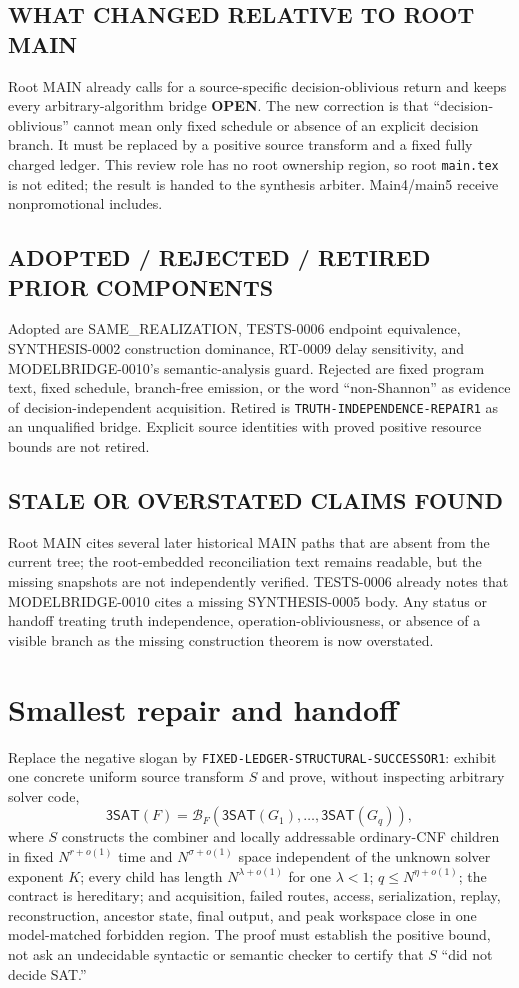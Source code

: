 \documentclass[11pt]{article}
\newcommand{\SAT}{\mathsf{3SAT}}
\newcommand{\OPEN}{\textbf{OPEN}}
\begin{document}
\subsection*{WHAT CHANGED RELATIVE TO ROOT MAIN}
Root MAIN already calls for a source-specific decision-oblivious return and
keeps every arbitrary-algorithm bridge \OPEN.  The new correction is that
``decision-oblivious'' cannot mean only fixed schedule or absence of an
explicit decision branch.  It must be replaced by a positive source transform
and a fixed fully charged ledger.  This review role has no root ownership
region, so root \texttt{main.tex} is not edited; the result is handed to the
synthesis arbiter.  Main4/main5 receive nonpromotional includes.

\subsection*{ADOPTED / REJECTED / RETIRED PRIOR COMPONENTS}
Adopted are SAME\_REALIZATION, TESTS-0006 endpoint equivalence,
SYNTHESIS-0002 construction dominance, RT-0009 delay sensitivity, and
MODELBRIDGE-0010's semantic-analysis guard.  Rejected are fixed program text,
fixed schedule, branch-free emission, or the word ``non-Shannon'' as evidence
of decision-independent acquisition.  Retired is
\texttt{TRUTH-INDEPENDENCE-REPAIR1} as an unqualified bridge.  Explicit
source identities with proved positive resource bounds are not retired.

\subsection*{STALE OR OVERSTATED CLAIMS FOUND}
Root MAIN cites several later historical MAIN paths that are absent from the
current tree; the root-embedded reconciliation text remains readable, but the
missing snapshots are not independently verified.  TESTS-0006 already notes
that MODELBRIDGE-0010 cites a missing SYNTHESIS-0005 body.  Any status or
handoff treating truth independence, operation-obliviousness, or absence of a
visible branch as the missing construction theorem is now overstated.

\section{Smallest repair and handoff}

Replace the negative slogan by
\texttt{FIXED-LEDGER-STRUCTURAL-SUCCESSOR1}: exhibit one concrete uniform
source transform $S$ and prove, without inspecting arbitrary solver code,
\[
 \SAT(F)=\mathcal B_F(\SAT(G_1),\ldots,\SAT(G_q)),        \tag{6}
\]
where $S$ constructs the combiner and locally addressable ordinary-CNF
children in fixed $N^{r+o(1)}$ time and $N^{\sigma+o(1)}$ space independent
of the unknown solver exponent $K$; every child has length
$N^{\lambda+o(1)}$ for one $\lambda<1$; $q\le N^{\eta+o(1)}$; the contract is
hereditary; and acquisition, failed routes, access, serialization, replay,
reconstruction, ancestor state, final output, and peak workspace close in one
model-matched forbidden region.  The proof must establish the positive bound,
not ask an undecidable syntactic or semantic checker to certify that $S$
``did not decide SAT.''
\end{document}
